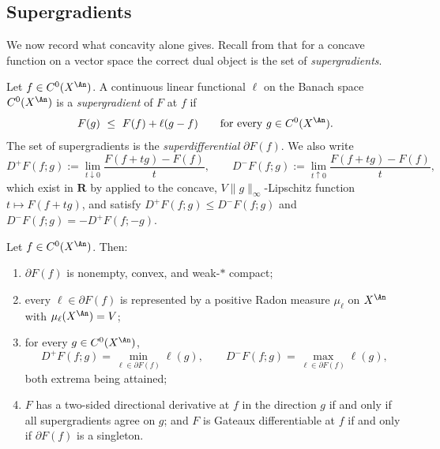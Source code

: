 \subsection{Supergradients}
\label{sec:ch27-supergradients}

We now record what concavity alone gives.  Recall from
 that for a concave function on a vector space
the correct dual object is the set of \emph{supergradients}.

\begin{definition}[Superdifferential]
\label{def:ch27-superdifferential}
Let \(f\in C^0(X^{\An})\).  A continuous linear functional \(\ell\) on the
Banach space \(C^0(X^{\An})\) is a \emph{supergradient} of \(F\) at \(f\) if
\begin{equation}\label{eq:ch27-supergradient-inequality}
 F(g)\ \leq\ F(f)+\ell(g-f)
 \qquad\text{for every }g\in C^0(X^{\An}).
\end{equation}
The set of supergradients is the \emph{superdifferential} \(\partial F(f)\).
We also write
\begin{equation}\label{eq:ch27-one-sided-directional}
 D^+F(f;g):=\lim_{t\downarrow0}\frac{F(f+tg)-F(f)}{t},
 \qquad
 D^-F(f;g):=\lim_{t\uparrow0}\frac{F(f+tg)-F(f)}{t},
\end{equation}
which exist in \(\mathbf R\) by  applied to
the concave, \(V\lVert g\rVert_\infty\)-Lipschitz function
\(t\mapsto F(f+tg)\), and satisfy \(D^+F(f;g)\leq D^-F(f;g)\) and
\(D^-F(f;g)=-D^+F(f;-g)\).
\end{definition}

\begin{theorem}
\label{thm:ch27-superdifferential}
Let \(f\in C^0(X^{\An})\).  Then:
\begin{enumerate}
\item \(\partial F(f)\) is nonempty, convex, and weak-\(*\) compact;
\item every \(\ell\in\partial F(f)\) is represented by a positive Radon
measure \(\mu_\ell\) on \(X^{\An}\) with
\(\mu_\ell(X^{\An})=V\);
\item for every \(g\in C^0(X^{\An})\),
\begin{equation}\label{eq:ch27-minmax-formula}
 D^+F(f;g)=\min_{\ell\in\partial F(f)}\ell(g),
 \qquad
 D^-F(f;g)=\max_{\ell\in\partial F(f)}\ell(g),
\end{equation}
both extrema being attained;
\item \(F\) has a two-sided directional derivative at \(f\) in the direction
\(g\) if and only if all supergradients agree on \(g\); and \(F\) is Gateaux
differentiable at \(f\) if and only if \(\partial F(f)\) is a singleton.
\end{enumerate}
\end{theorem}

